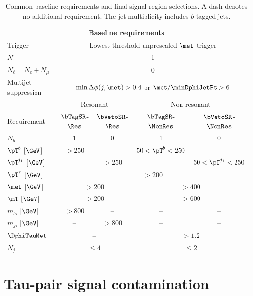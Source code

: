 \begin{table}[htbp]
    \centering
    \small
    \caption{Common baseline requirements and final signal-region selections. A dash denotes no additional requirement. The jet multiplicity includes $b$-tagged jets.}
    \label{tab:ch7_signal_regions}
    \begin{tabular}{lcccc}
        \toprule
        \multicolumn{5}{c}{Baseline requirements} \\
        \midrule
        Trigger & \multicolumn{4}{c}{Lowest-threshold unprescaled $\met$ trigger} \\
        $N_\tau$ & \multicolumn{4}{c}{1} \\
        $N_\ell=N_e+N_\mu$ & \multicolumn{4}{c}{0} \\
        Multijet suppression & \multicolumn{4}{c}{$\min\Delta\phi(j,\met)>0.4$ or $\met/\minDphiJetPt>6$} \\
        \midrule
        & \multicolumn{2}{c}{Resonant} & \multicolumn{2}{c}{Non-resonant} \\
        Requirement & $\bTagSR$-$\Res$ & $\bVetoSR$-$\Res$ & $\bTagSR$-$\NonRes$ & $\bVetoSR$-$\NonRes$ \\
        \midrule
        $N_b$ & 1 & 0 & 1 & 0 \\
        $\pT^b$ [$\GeV$] & $>250$ & -- & $50<\pT^b<250$ & -- \\
        $\pT^{j_1}$ [$\GeV$] & -- & $>250$ & -- & $50<\pT^{j_1}<250$ \\
        $\pT^\tau$ [$\GeV$] & \multicolumn{4}{c}{$>200$} \\
        $\met$ [$\GeV$] & \multicolumn{2}{c}{$>200$} & \multicolumn{2}{c}{$>400$} \\
        $\mT$ [$\GeV$] & \multicolumn{2}{c}{$>200$} & \multicolumn{2}{c}{$>600$} \\
        $m_{b\tau}$ [$\GeV$] & $>800$ & -- & -- & -- \\
        $m_{j\tau}$ [$\GeV$] & -- & $>800$ & -- & -- \\
        $\DphiTauMet$ & \multicolumn{2}{c}{--} & \multicolumn{2}{c}{$>1.2$} \\
        $N_j$ & \multicolumn{2}{c}{$\leq4$} & \multicolumn{2}{c}{$\leq2$} \\
        \bottomrule
    \end{tabular}
\end{table}

\clearpage
\section{Tau-pair signal contamination}
\label{sec:ch7_tautau_contamination}

